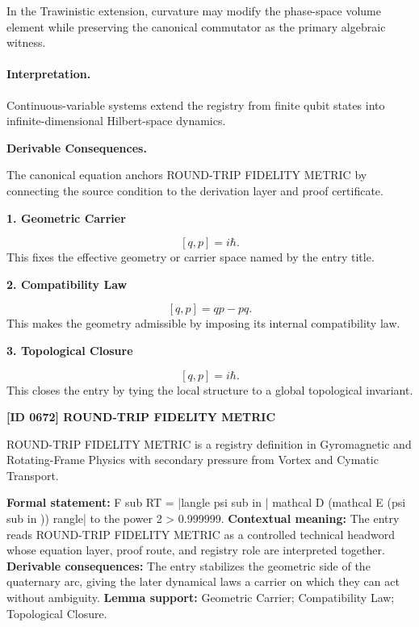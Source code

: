 In the Trawinistic extension, curvature may modify the phase-space volume element while preserving the canonical commutator as the primary algebraic witness.

\paragraph{Interpretation.}
Continuous-variable systems extend the registry from finite qubit states into infinite-dimensional Hilbert-space dynamics.

\par\vspace{0.35em}
\noindent\textbf{Derivable Consequences.}\quad
\begingroup
\footnotesize
\raggedright
The canonical equation anchors ROUND-TRIP FIDELITY METRIC by connecting the source condition to the derivation layer and proof certificate.
\par\endgroup

\noindent\textbf{1. Geometric Carrier}\par
\[
[q,p]=i\hbar.
\]
\noindent This fixes the effective geometry or carrier space named by the entry title.\par
\noindent\textbf{2. Compatibility Law}\par
\[
[q,p]=qp-pq.
\]
\noindent This makes the geometry admissible by imposing its internal compatibility law.\par
\noindent\textbf{3. Topological Closure}\par
\[
\boxed{ [q,p]=i\hbar. }
\]
\noindent This closes the entry by tying the local structure to a global topological invariant.\par

\clearpage
\noindent\textbf{[ID 0672] ROUND-TRIP FIDELITY METRIC}\par
\vspace{0.35em}
\begingroup\small
{}
ROUND-TRIP FIDELITY METRIC is a registry definition in Gyromagnetic and Rotating-Frame Physics with secondary pressure from Vortex and Cymatic Transport.

\begingroup\footnotesize\setlength{\emergencystretch}{3em}\sloppy
\textbf{Formal statement:} F sub RT = |langle psi sub in | mathcal D (mathcal E (psi sub in )) rangle| to the power 2 > 0.999999. \textbf{Contextual meaning:} The entry reads ROUND-TRIP FIDELITY METRIC as a controlled technical headword whose equation layer, proof route, and registry role are interpreted together. \textbf{Derivable consequences:} The entry stabilizes the geometric side of the quaternary arc, giving the later dynamical laws a carrier on which they can act without ambiguity. \textbf{Lemma support:} Geometric Carrier; Compatibility Law; Topological Closure.\par
\endgroup

